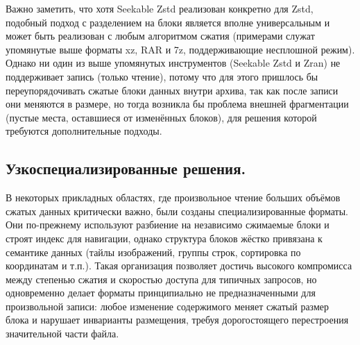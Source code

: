 Важно заметить, что хотя Seekable Zstd реализован конкретно для Zstd, подобный подход с разделением на блоки является вполне универсальным и может быть реализован с любым алгоритмом сжатия (примерами служат упомянутые выше форматы xz, RAR и 7z, поддерживающие несплошной режим). Однако ни один из выше упомянутых инструментов (Seekable Zstd и Zran) не поддерживает запись (только чтение), потому что для этого пришлось бы переупорядочивать сжатые блоки данных внутри архива, так как после записи они меняются в размере, но тогда возникла бы проблема внешней фрагментации (пустые места, оставшиеся от изменённых блоков), для решения которой требуются дополнительные подходы.

\subsection*{Узкоспециализированные решения.}

В некоторых прикладных областях, где произвольное чтение больших объёмов сжатых данных критически важно, были созданы специализированные форматы. Они по-прежнему используют разбиение на независимо сжимаемые блоки и строят индекс для навигации, однако структура блоков жёстко привязана к семантике данных (тайлы изображений, группы строк, сортировка по координатам и т.п.). Такая организация позволяет достичь высокого компромисса между степенью сжатия и скоростью доступа для типичных запросов, но одновременно делает форматы принципиально не предназначенными для произвольной записи: любое изменение содержимого меняет сжатый размер блока и нарушает инварианты размещения, требуя дорогостоящего перестроения значительной части файла.

